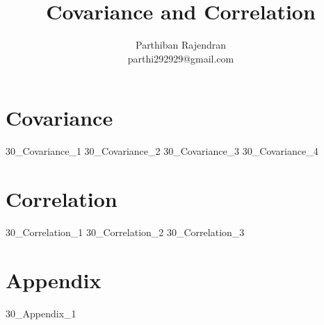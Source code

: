 \documentclass[float=false, crop=false,11pt,oneside]{book}
\title{Covariance and Correlation}
\author{Parthiban Rajendran \\ \small parthi292929@gmail.com}
\begin{document}
    
    \maketitle 

    \tableofcontents

    \chapter{Covariance}
	{30_Covariance_1}   
	{30_Covariance_2}   
	{30_Covariance_3}   	
	{30_Covariance_4}  
	
	\chapter{Correlation} 	
	{30_Correlation_1}   
	{30_Correlation_2}   
	{30_Correlation_3}   	
	
	\chapter{Appendix}
	{30_Appendix_1}   
	
	\nocite{*}
	 	
\end{document}
